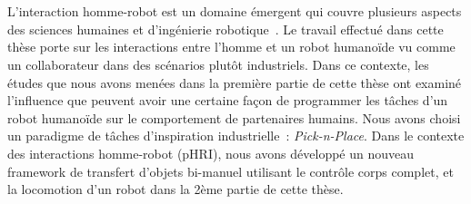 {\color{blue}\chapter*{}}
\thispagestyle{empty}


L'interaction homme-robot est un domaine émergent qui couvre plusieurs aspects des sciences humaines et d'ingénierie robotique~\cite{goodrich2008human}. Le travail effectué dans cette thèse porte sur les interactions entre l'homme et un robot humanoïde vu comme un collaborateur dans des scénarios plutôt industriels. Dans ce contexte, les études que nous avons menées dans la première partie de cette thèse ont examiné l'influence que peuvent avoir une certaine façon de programmer les tâches d'un robot humanoïde sur le comportement de partenaires humains. Nous avons choisi un paradigme de tâches d'inspiration industrielle~: \textit{Pick-n-Place}. Dans le contexte des interactions homme-robot (pHRI), nous avons développé un nouveau framework de transfert d'objets bi-manuel utilisant le contrôle corps complet, et la locomotion d'un robot dans la 2ème partie de cette thèse.\\



